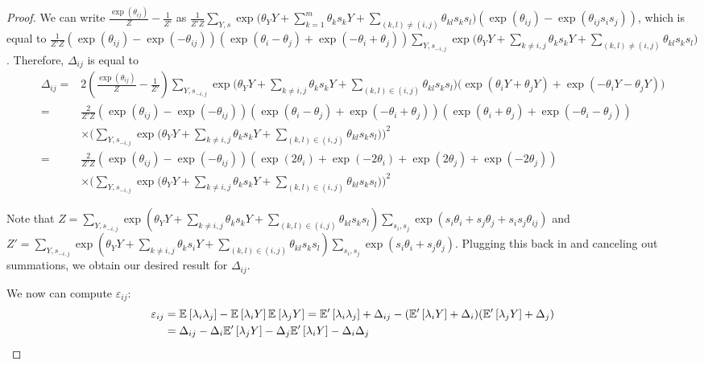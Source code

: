 \begin{proof}
We can write $\frac{\exp(\theta_{ij})}{Z} - \frac{1}{Z'}$ as $\frac{1}{Z' Z} \sum_{Y, s} \exp\big(\theta_Y Y + \sum_{k = 1}^m \theta_k s_k Y + \sum_{(k, l) \neq (i, j)} \theta_{kl} s_k s_l\big) (\exp(\theta_{ij}) - \exp(\theta_{ij} s_i s_j))$, which is equal to $\frac{1}{Z' Z} (\exp(\theta_{ij}) - \exp(-\theta_{ij})) (\exp(\theta_i - \theta_j) + \exp(-\theta_i + \theta_j)) \sum_{Y, s_{-i, j}} \exp\big(\theta_Y Y + \sum_{k \neq i, j} \theta_k s_k Y + \sum_{(k, l) \neq (i, j)} \theta_{kl} s_k s_l\big)$. Therefore, $\Delta_{ij}$ is equal to
\begin{align}
    \Delta_{ij} =& 2 \left(\frac{\exp(\theta_{ij})}{Z} - \frac{1}{Z'} \right) \sum_{Y, s_{-i, j}} \exp \big(\theta_Y Y + \sum_{k \neq i, j} \theta_k s_k Y + \sum_{(k, l) \in (i, j)} \theta_{kl} s_k s_l\big) \big(\exp(\theta_i Y + \theta_j Y) + \exp(-\theta_i Y - \theta_j Y) \big) \\
    =& \frac{2}{Z' Z} (\exp(\theta_{ij}) - \exp(-\theta_{ij})) (\exp(\theta_i - \theta_j) + \exp(-\theta_i + \theta_j))(\exp(\theta_i + \theta_j) + \exp(-\theta_i - \theta_j))  \\
    & \times \bigg(\sum_{Y, s_{-i, j}} \exp \big(\theta_Y Y + \sum_{k \neq i, j} \theta_k s_k Y + \sum_{(k, l) \in (i, j)} \theta_{kl} s_k s_l\big)\bigg)^2 \\
    =& \frac{2}{Z' Z} (\exp(\theta_{ij}) - \exp(-\theta_{ij})) (\exp(2\theta_i) + \exp(-2\theta_i) + \exp(2\theta_j) + \exp(-2\theta_j))  \\
    & \times \bigg(\sum_{Y, s_{-i, j}} \exp \big(\theta_Y Y + \sum_{k \neq i, j} \theta_k s_k Y + \sum_{(k, l) \in (i, j)} \theta_{kl} s_k s_l\big)\bigg)^2
\end{align}

Note that $Z = \sum_{Y, s_{-i, j}} \exp(\theta_Y Y + \sum_{k \neq i, j} \theta_k s_k Y + \sum_{(k, l) \in (i, j)} \theta_{kl} s_k s_l) \sum_{s_i, s_j} \exp(s_i \theta_i + s_j \theta_j + s_i s_j \theta_{ij})$ and $Z' = \sum_{Y, s_{-i, j}} \exp(\theta_Y Y + \sum_{k \neq i, j} \theta_k s_i Y + \sum_{(k, l) \in (i, j)} \theta_{kl} s_k s_l) \sum_{s_i, s_j} \exp(s_i \theta_i + s_j \theta_j)$. Plugging this back in and canceling out summations, we obtain our desired result for $\Delta_{ij}$.


We now can compute $\varepsilon_{ij}$:
\begin{align}
    \varepsilon_{ij} &= \mathbb{E}_{}\left[\lambda_i \lambda_j\right] - \mathbb{E}_{}\left[\lambda_i Y\right] \mathbb{E}_{}\left[\lambda_j Y\right] = \mathbb{E}'_{}\left[\lambda_i \lambda_j\right] + \Delta_{ij} - (\mathbb{E}'_{}\left[\lambda_i Y\right] + \Delta_i)(\mathbb{E}'_{}\left[\lambda_j Y\right] + \Delta_j) \\
    &= \Delta_{ij} - \Delta_i \mathbb{E}'_{}\left[\lambda_j Y\right] - \Delta_j \mathbb{E}'_{}\left[\lambda_i Y\right] - \Delta_i \Delta_j
\end{align}




\end{proof}
